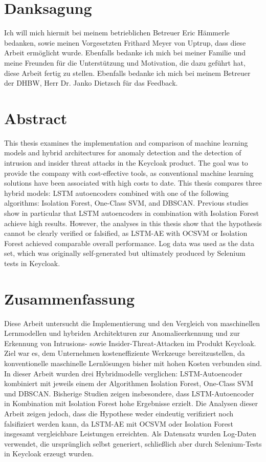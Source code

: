 \documentclass[a4paper,12pt]{article}
\begin{document}
	\section*{Danksagung}
	Ich will mich hiermit bei meinem betrieblichen Betreuer Eric Hämmerle bedanken, sowie meinen Vorgesetzten Frithard Meyer von Uptrup, dass diese Arbeit ermöglicht wurde. Ebenfalls bedanke ich mich bei meiner Familie und meine Freunden für die Unterstützung und Motivation, die dazu geführt hat, diese Arbeit fertig zu stellen. Ebenfalls bedanke ich mich bei meinem Betreuer der DHBW, Herr Dr. Janko Dietzsch für das Feedback.
	
	
	\newpage
	\section*{Abstract}
	This thesis examines the implementation and comparison of machine learning models and hybrid architectures for anomaly detection and the detection of intrusion and insider threat attacks in the Keycloak product. The goal was to provide the company with cost-effective tools, as conventional machine learning solutions have been associated with high costs to date. This thesis compares three hybrid models: LSTM autoencoders combined with one of the following algorithms: Isolation Forest, One-Class SVM, and DBSCAN. Previous studies show in particular that LSTM autoencoders in combination with Isolation Forest achieve high results. However, the analyses in this thesis show that the hypothesis cannot be clearly verified or falsified, as LSTM-AE with OCSVM or Isolation Forest achieved comparable overall performance. Log data was used as the data set, which was originally self-generated but ultimately produced by Selenium tests in Keycloak.
	
	
	\newpage
	\section*{Zusammenfassung}
	Diese Arbeit untersucht die Implementierung und den Vergleich von maschinellen Lernmodellen und hybriden Architekturen zur Anomalieerkennung und zur Erkennung von Intrusions- sowie Insider-Threat-Attacken im Produkt Keycloak. Ziel war es, dem Unternehmen kosteneffiziente Werkzeuge bereitzustellen, da konventionelle maschinelle Lernlösungen bisher mit hohen Kosten verbunden sind. In dieser Arbeit wurden drei Hybridmodelle verglichen: LSTM-Autoencoder kombiniert mit jeweils einem der Algorithmen Isolation Forest, One-Class SVM und DBSCAN. Bisherige Studien zeigen insbesondere, dass LSTM-Autoencoder in Kombination mit Isolation Forest hohe Ergebnisse erzielt. Die Analysen dieser Arbeit zeigen jedoch, dass die Hypothese weder eindeutig verifiziert noch falsifiziert werden kann, da LSTM-AE mit OCSVM oder Isolation Forest insgesamt vergleichbare Leistungen erreichten. Als Datensatz wurden Log-Daten verwendet, die ursprünglich selbst generiert, schließlich aber durch Selenium-Tests in Keycloak erzeugt wurden.
	
\end{document}
